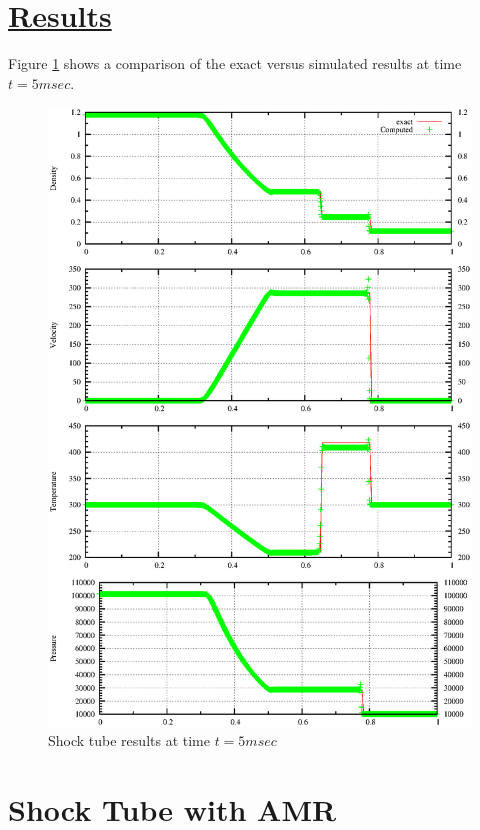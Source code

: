 \documentclass[fleqn]{article}
\begin{document}
\section*{\underline{Results}}
Figure \ref{results} shows a comparison of the exact versus simulated results at time $t = 5msec$.
\begin{figure}
\includegraphics[scale=.85]{figures/shockTube.ps}
\caption{Shock tube results at time $t = 5msec$}
\label{results}
\end{figure}
\newpage


\section*{\center Shock Tube with AMR}
 
\end{document}
